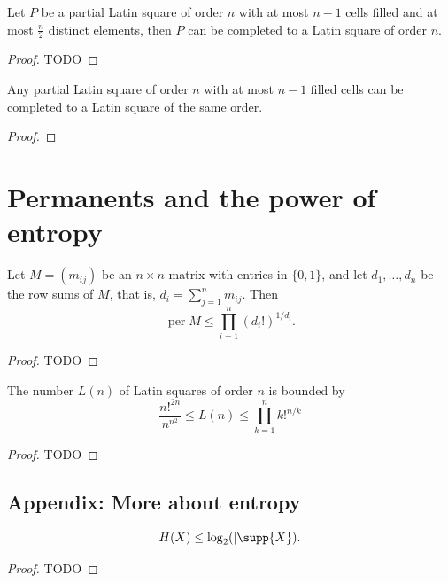 \begin{lemma}
  \label{ch36lemma2}
  Let $P$ be a partial Latin square of order $n$ with at most $n - 1$ cells filled and at
  most $\frac{n}{2}$ distinct elements, then $P$ can be completed to a Latin square of
  order $n$.
\end{lemma}
\begin{proof}
  TODO
\end{proof}


\begin{theorem}
  \label{smetaniuk_theorem}
  Any partial Latin square of order $n$ with at most $n - 1$ filled cells can be completed to a
  Latin square of the same order.
\end{theorem}
\begin{proof}
\end{proof}


\chapter{Permanents and the power of entropy}

\begin{theorem}
  \label{ch37theorem1}
  Let $M = (m_{ij})$ be an $n \times n$ matrix with entries in $\{0, 1\}$, and let $d_1, \dots, d_n$ be the row sums of $M$, that is, $d_i = \sum_{j=1}^{n} m_{ij}$. Then
\[
\operatorname{per} M \leq \prod_{i=1}^{n} (d_i!)^{1/d_i}.
\]
\end{theorem}
\begin{proof}
  TODO
\end{proof}

\begin{theorem}
  \label{ch37theorem2}
  The number $L(n)$ of Latin squares of order $n$ is bounded by
  \[
  \frac{n!^{2n}}{n^{n^2}} \le L(n) \le \prod_{k=1}^{n}k!^{n/k}
  \]
\end{theorem}
\begin{proof}
  TODO
\end{proof}

\section{Appendix: More about entropy}

\begin{theorem}[Fact A]
  \label{ch37fact_a}
  \[H(X)\le \log_2(|\supp{X}).\]
\end{theorem}
\begin{proof}
  TODO
\end{proof}

